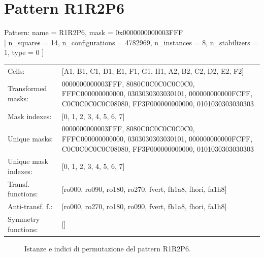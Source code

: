 \newpage

\section{Pattern R1R2P6}

\begin{tcolorbox}[sharp corners, fontupper=\ttfamily\small, colback=white]
  \noindent Pattern: name = R1R2P6, mask = 0x0000000000003FFF\\
  {[} n\_squares = 14, n\_configurations = 4782969,
  n\_instances = 8, n\_stabilizers = 1, type = 0 { ]}\\[1.0ex]
  \begin{tabularx}{\textwidth}{@{} p{3.5cm} X @{}}
    Cells:               & {[}A1, B1, C1, D1, E1, F1, G1, H1, A2, B2, C2, D2, E2, F2{]}\\[0.5ex]
    Transformed masks:   & 0000000000003FFF, 8080C0C0C0C0C0C0, FFFC000000000000, 0303030303030101, 000000000000FCFF, C0C0C0C0C0C08080, FF3F000000000000, 0101030303030303\\[0.5ex]
    Mask indexes:        & {[}0, 1, 2, 3, 4, 5, 6, 7{]}\\[0.5ex]
    Unique masks:        & 0000000000003FFF, 8080C0C0C0C0C0C0, FFFC000000000000, 0303030303030101, 000000000000FCFF, C0C0C0C0C0C08080, FF3F000000000000, 0101030303030303\\[0.5ex]
    Unique mask indexes: & {[}0, 1, 2, 3, 4, 5, 6, 7{]}\\[0.5ex]
    Transf. functions:   & {[}ro000, ro090, ro180, ro270, fvert, fh1a8, fhori, fa1h8{]}\\[0.5ex]
    Anti-transf. f.:     & {[}ro000, ro270, ro180, ro090, fvert, fh1a8, fhori, fa1h8{]}\\[0.5ex]
    Symmetry functions:  & {[}{]}\\[0.5ex]
  \end{tabularx}
\end{tcolorbox}

\begin{figure}[htbp]
  \centering
   \hfill
   \hfill
   \hfill
  \vspace{0.3cm}
   \hfill
   \hfill
   \hfill
  \caption{Istanze e indici di permutazione del pattern R1R2P6.}
\end{figure}

